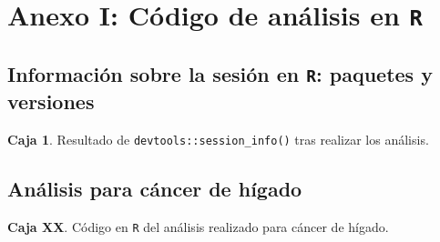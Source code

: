 \section*{Anexo I: Código de análisis en \texttt{R}}\label{anexo1}

\subsection*{Información sobre la sesión en \texttt{R}: paquetes y versiones}

\textbf{Caja 1}. Resultado de \texttt{devtools::session\_info()} tras realizar los análisis.



\subsection*{Análisis para cáncer de hígado}

\textbf{Caja XX}. Código en \texttt{R} del análisis realizado para cáncer de hígado.


